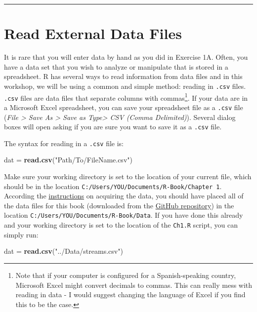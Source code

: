 \documentclass[]{book}
\newenvironment{Shaded}{\begin{snugshade}}{\end{snugshade}}
\newcommand{\KeywordTok}[1]{\textcolor[rgb]{0.13,0.29,0.53}{\textbf{#1}}}
\newcommand{\StringTok}[1]{\textcolor[rgb]{0.31,0.60,0.02}{#1}}
\newcommand{\NormalTok}[1]{#1}
\let\rmarkdownfootnote\footnote%
\def\footnote{\protect\rmarkdownfootnote}
\theoremstyle{definition}
\theoremstyle{definition}
\theoremstyle{definition}
\theoremstyle{remark}
\begin{document}
\begin{center}\rule{0.5\linewidth}{\linethickness}\end{center}

\section{Read External Data Files}\label{read}

It is rare that you will enter data by hand as you did in Exercise 1A.
Often, you have a data set that you wish to analyze or manipulate that
is stored in a spreadsheet. R has several ways to read information from
data files and in this workshop, we will be using a common and simple
method: reading in \texttt{.csv} files. \texttt{.csv} files are data
files that separate columns with commas\footnote{Note that if your
  computer is configured for a Spanish-speaking country, Microsoft Excel
  might convert decimals to commas. This can really mess with reading in
  data - I would suggest changing the language of Excel if you find this
  to be the case.}. If your data are in a Microsoft Excel spreadsheet,
you can save your spreadsheet file as a \texttt{.csv} file (\emph{File
\textgreater{} Save As \textgreater{} Save as Type\textgreater{} CSV
(Comma Delimited)}). Several dialog boxes will open asking if you are
sure you want to save it as a \texttt{.csv} file.

The syntax for reading in a \texttt{.csv} file is:

\begin{Shaded}
\begin{Highlighting}[]
\NormalTok{dat =}\StringTok{ }\KeywordTok{read.csv}\NormalTok{(}\StringTok{"Path/To/FileName.csv"}\NormalTok{)}
\end{Highlighting}
\end{Shaded}

Make sure your working directory is set to the location of your current
file, which should be in the location
\texttt{C:/Users/YOU/Documents/R-Book/Chapter\ 1}. According the
\protect\hyperlink{data-sets}{instructions} on acquiring the data, you
should have placed all of the data files for this book (downloaded from
the \href{}{GitHub repository}) in the location
\texttt{C:/Users/YOU/Documents/R-Book/Data}. If you have done this
already and your working directory is set to the location of the
\texttt{Ch1.R} script, you can simply run:

\begin{Shaded}
\begin{Highlighting}[]
\NormalTok{dat =}\StringTok{ }\KeywordTok{read.csv}\NormalTok{(}\StringTok{"../Data/streams.csv"}\NormalTok{)}
\end{Highlighting}
\end{Shaded}
\end{document}
